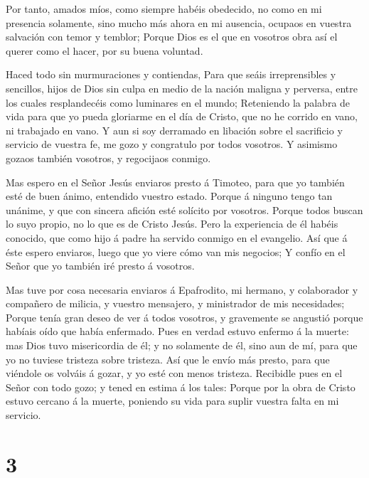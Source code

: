  Por tanto, amados míos, como siempre habéis obedecido, no
como en mi presencia solamente, sino mucho más ahora en mi ausencia,
ocupaos en vuestra salvación con temor y temblor;  Porque
Dios es el que en vosotros obra así el querer como el hacer, por su
buena voluntad.

 Haced todo sin murmuraciones y contiendas, 
Para que seáis irreprensibles y sencillos, hijos de Dios sin culpa en
medio de la nación maligna y perversa, entre los cuales resplandecéis
como luminares en el mundo;  Reteniendo la palabra de vida
para que yo pueda gloriarme en el día de Cristo, que no he corrido en
vano, ni trabajado en vano.  Y aun si soy derramado en
libación sobre el sacrificio y servicio de vuestra fe, me gozo y
congratulo por todos vosotros.  Y asimismo gozaos también
vosotros, y regocijaos conmigo.

 Mas espero en el Señor Jesús enviaros presto á Timoteo,
para que yo también esté de buen ánimo, entendido vuestro estado.
 Porque á ninguno tengo tan unánime, y que con sincera
afición esté solícito por vosotros.  Porque todos buscan lo
suyo propio, no lo que es de Cristo Jesús.  Pero la
experiencia de él habéis conocido, que como hijo á padre ha servido
conmigo en el evangelio.  Así que á éste espero enviaros,
luego que yo viere cómo van mis negocios;  Y confío en el
Señor que yo también iré presto á vosotros.

 Mas tuve por cosa necesaria enviaros á Epafrodito, mi
hermano, y colaborador y compañero de milicia, y vuestro mensajero, y
ministrador de mis necesidades;  Porque tenía gran deseo de
ver á todos vosotros, y gravemente se angustió porque habíais oído que
había enfermado.  Pues en verdad estuvo enfermo á la
muerte: mas Dios tuvo misericordia de él; y no solamente de él, sino aun
de mí, para que yo no tuviese tristeza sobre tristeza.  Así
que le envío más presto, para que viéndole os volváis á gozar, y yo esté
con menos tristeza.  Recibidle pues en el Señor con todo
gozo; y tened en estima á los tales:  Porque por la obra de
Cristo estuvo cercano á la muerte, poniendo su vida para suplir vuestra
falta en mi servicio.

\hypertarget{section-2}{%
\section{3}\label{section-2}}

